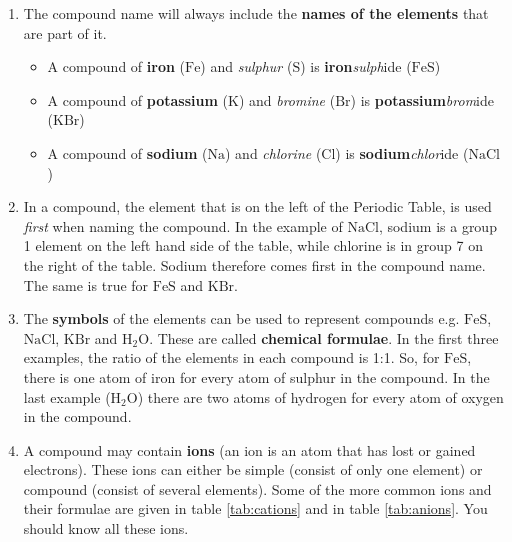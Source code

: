       \label{m38708*id64037}\begin{enumerate}[noitemsep, label=\textbf{\arabic*}. ] 
            \label{m38708*uid35}\item The compound name will always include the \textbf{names of the elements} that are part of it.
\label{m38708*id64059}\begin{itemize}[noitemsep]
            \label{m38708*uid36}\item A compound of \textbf{iron} ($\text{Fe}$) and \textsl{sulphur} ($\text{S}$) is \textbf{iron}\hspace{1ex}\textsl{sulph}ide ($\text{FeS}$)
\label{m38708*uid37}\item A compound of \textbf{potassium} ($\text{K}$) and \textsl{bromine} ($\text{Br}$) is \textbf{potassium}\hspace{1ex}\textsl{brom}ide ($\text{KBr}$)
\label{m38708*uid38}\item A compound of \textbf{sodium} ($\text{Na}$) and \textsl{chlorine} ($\text{Cl}$) is \textbf{sodium}\hspace{1ex}\textsl{chlor}ide ($\text{NaCl}$)
\end{itemize}
        \label{m38708*uid39}\item In a compound, the element that is on the left of the Periodic Table, is used \textsl{first} when naming the compound. In the example of $\text{NaCl}$, sodium is a group 1 element on the left hand side of the table, while chlorine is in group 7 on the right of the table. Sodium therefore comes first in the compound name. The same is true for $\text{FeS}$ and $\text{KBr}$.
\label{m38708*uid40}\item The \textbf{symbols} of the elements can be used to represent compounds e.g. $\text{FeS}$, $\text{NaCl}$, $\text{KBr}$ and $\text{H}{}_{2}\text{O}$. These are called \textbf{chemical formulae}. In the first three examples, the ratio of the elements in each compound is 1:1. So, for $\text{FeS}$, there is one atom of iron for every atom of sulphur in the compound. In the last example ($\text{H}{}_{2}\text{O}$) there are two atoms of hydrogen for every atom of oxygen in the compound.
\item A compound may contain \textbf{ions} (an ion is an atom that has lost or gained electrons). These ions can either be simple (consist of only one element) or compound (consist of several elements). Some of the more common ions and their formulae are given in table \ref{tab:cations} and in table \ref{tab:anions}. You should know all these ions.\\


\end{enumerate}

